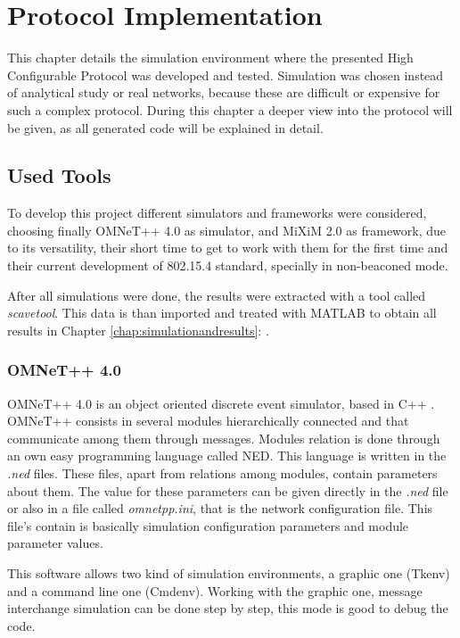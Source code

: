 \chapter{Protocol Implementation}
\label{chap:protocolimplementation}

This chapter details the simulation environment where the presented High Configurable Protocol was developed and tested. Simulation was chosen 
instead of analytical study or real networks, because these are difficult or expensive for such a complex protocol. During this chapter a 
deeper view into the protocol will be given, as all generated code will be explained in detail.

\section{Used Tools}

To develop this project different simulators and frameworks were considered, choosing finally \ac{OMNeT++} 4.0 \cite{OMNeT}
as simulator, and \ac{MiXiM} 2.0 \cite{MiXiM} as framework, due to its versatility, their short time to get to work with them for the first time and 
their current development of 802.15.4 standard, specially in non-beaconed mode.

After all simulations were done, the results were extracted with a tool called \textit{scavetool}. This data is than imported and treated with 
\ac{MATLAB} \cite{MATLAB} to obtain all results in Chapter \ref{chap:simulationandresults}: .

\subsection{\ac{OMNeT++} 4.0}

\ac{OMNeT++} 4.0 is an object oriented discrete event simulator, based in C++ \cite{cpp}. \ac{OMNeT++} consists in several modules hierarchically
connected and that communicate among them through messages. Modules relation is done through an own easy programming language called \ac{NED}.
This language is written in the \textit{.ned} files. These files, apart from relations among modules, contain parameters about them. The value for these
parameters can be given directly in the \textit{.ned} file or also in a file called \textit{omnetpp.ini}, that is the network configuration file.
This file's contain is basically simulation configuration parameters and module parameter values.

This software allows two kind of simulation environments, a graphic one (Tkenv) and a command line one (Cmdenv). Working with the graphic one, 
message interchange simulation can be done step by step, this mode is good to debug the code.


